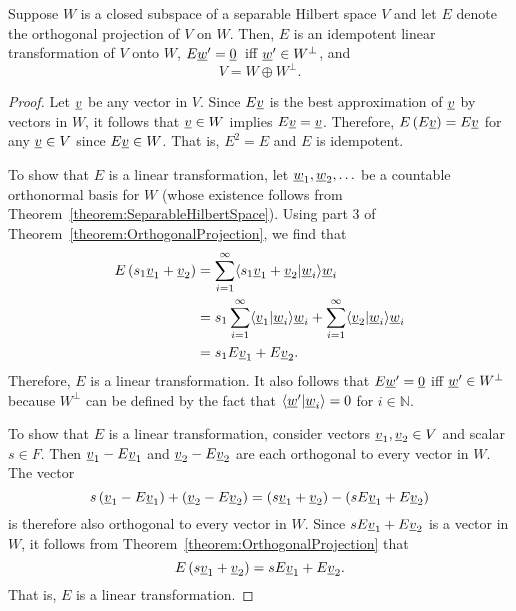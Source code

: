 \begin{theorem} \label{theorem:OrthogonalSubspaceDirectSum}
Suppose $W$ is a closed subspace of a separable Hilbert space $V$ and let $E$ denote the orthogonal projection of $V$ on $W$.
Then, $E$ is an idempotent linear transformation of $V$ onto $W$, $E \underline{w}' = \underline{0}\,$ iff $\underline{w}' \in W^{\bot}$, and
\begin{equation*}
V = W \oplus W^{\bot}.
\end{equation*}
\end{theorem}
\begin{proof}
Let $\underline{v}$ be any vector in $V$.
Since $E \underline{v}$ is the best approximation of $\underline{v}$ by vectors in $W$, it follows that $\underline{v} \in W$ implies $E \underline{v} = \underline{v}$.
Therefore, $E \left( E \underline{v} \right) = E \underline{v}$ for any $\underline{v} \in V$ since $E \underline{v} \in W$.
That is, $E^2 = E$ and $E$ is idempotent.

To show that $E$ is a linear transformation, let $\underline{w}_1 , \underline{w}_2 , \ldots$ be a countable orthonormal basis for $W$ (whose existence follows from Theorem~\ref{theorem:SeparableHilbertSpace}).
Using part 3 of Theorem~\ref{theorem:OrthogonalProjection}, we find that
\begin{align*}
E \left( s_1 \underline{v}_1 + \underline{v}_2 \right)
& = \sum_{i=1}^\infty \langle  s_1 \underline{v}_1 + \underline{v}_2 | \underline{w}_i \rangle \underline{w}_i \\
& = s_1 \sum_{i=1}^\infty \langle  \underline{v}_1 | \underline{w}_i \rangle \underline{w}_i + \sum_{i=1}^\infty \langle  \underline{v}_2 | \underline{w}_i \rangle \underline{w}_i \\
& = s_1 E \underline{v}_1 + E \underline{v}_2.
\end{align*}
Therefore, $E$ is a linear transformation.
It also follows that $E \underline{w}' = \underline{0}$ iff $\underline{w}' \in W^{\bot}$ because $W^{\bot}$ can be defined by the fact that $\langle \underline{w}' | \underline{w}_i \rangle = 0$ for $i\in \mathbb{N}$.

\iffalse
To show that $E$ is a linear transformation, consider vectors $\underline{v}_1, \underline{v}_2 \in V$ and scalar $s \in F$.
Then $\underline{v}_1 - E \underline{v}_1$ and $\underline{v}_2 - E \underline{v}_2$ are each orthogonal to every vector in $W$.
The vector
\begin{equation*}
s \left( \underline{v}_1 - E \underline{v}_1 \right) + \left( \underline{v}_2 - E \underline{v}_2 \right) = \left( s \underline{v}_1 + \underline{v}_2 \right) - \left( s E \underline{v}_1 + E \underline{v}_2 \right)
\end{equation*}
is therefore also orthogonal to every vector in $W$.
Since $s E \underline{v}_1 + E \underline{v}_2$ is a vector in $W$, it follows from Theorem~\ref{theorem:OrthogonalProjection} that
\begin{equation*}
E \left( s \underline{v}_1 + \underline{v}_2 \right) = s E \underline{v}_1 + E \underline{v}_2.
\end{equation*}
That is, $E$ is a linear transformation.


\end{proof}
